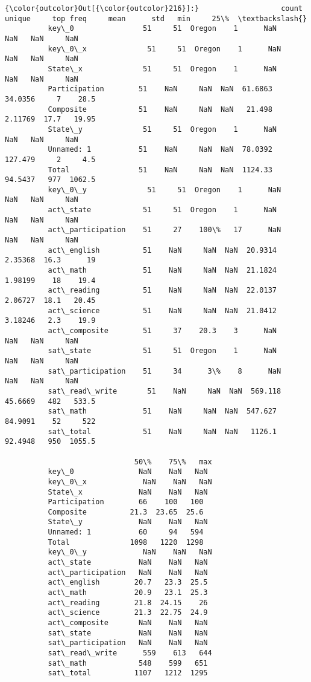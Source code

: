 \documentclass[11pt]{article}
\begin{document}
\begin{Verbatim}[commandchars=\\\{\}]
{\color{outcolor}Out[{\color{outcolor}216}]:}                   count unique     top freq     mean      std   min     25\%  \textbackslash{}
          key\_0                51     51  Oregon    1      NaN      NaN   NaN     NaN   
          key\_0\_x              51     51  Oregon    1      NaN      NaN   NaN     NaN   
          State\_x              51     51  Oregon    1      NaN      NaN   NaN     NaN   
          Participation        51    NaN     NaN  NaN  61.6863  34.0356     7    28.5   
          Composite            51    NaN     NaN  NaN   21.498  2.11769  17.7   19.95   
          State\_y              51     51  Oregon    1      NaN      NaN   NaN     NaN   
          Unnamed: 1           51    NaN     NaN  NaN  78.0392  127.479     2     4.5   
          Total                51    NaN     NaN  NaN  1124.33  94.5437   977  1062.5   
          key\_0\_y              51     51  Oregon    1      NaN      NaN   NaN     NaN   
          act\_state            51     51  Oregon    1      NaN      NaN   NaN     NaN   
          act\_participation    51     27    100\%   17      NaN      NaN   NaN     NaN   
          act\_english          51    NaN     NaN  NaN  20.9314  2.35368  16.3      19   
          act\_math             51    NaN     NaN  NaN  21.1824  1.98199    18    19.4   
          act\_reading          51    NaN     NaN  NaN  22.0137  2.06727  18.1   20.45   
          act\_science          51    NaN     NaN  NaN  21.0412  3.18246   2.3    19.9   
          act\_composite        51     37    20.3    3      NaN      NaN   NaN     NaN   
          sat\_state            51     51  Oregon    1      NaN      NaN   NaN     NaN   
          sat\_participation    51     34      3\%    8      NaN      NaN   NaN     NaN   
          sat\_read\_write       51    NaN     NaN  NaN  569.118  45.6669   482   533.5   
          sat\_math             51    NaN     NaN  NaN  547.627  84.9091    52     522   
          sat\_total            51    NaN     NaN  NaN   1126.1  92.4948   950  1055.5   
          
                              50\%    75\%   max  
          key\_0               NaN    NaN   NaN  
          key\_0\_x             NaN    NaN   NaN  
          State\_x             NaN    NaN   NaN  
          Participation        66    100   100  
          Composite          21.3  23.65  25.6  
          State\_y             NaN    NaN   NaN  
          Unnamed: 1           60     94   594  
          Total              1098   1220  1298  
          key\_0\_y             NaN    NaN   NaN  
          act\_state           NaN    NaN   NaN  
          act\_participation   NaN    NaN   NaN  
          act\_english        20.7   23.3  25.5  
          act\_math           20.9   23.1  25.3  
          act\_reading        21.8  24.15    26  
          act\_science        21.3  22.75  24.9  
          act\_composite       NaN    NaN   NaN  
          sat\_state           NaN    NaN   NaN  
          sat\_participation   NaN    NaN   NaN  
          sat\_read\_write      559    613   644  
          sat\_math            548    599   651  
          sat\_total          1107   1212  1295  
\end{Verbatim}
\end{document}
